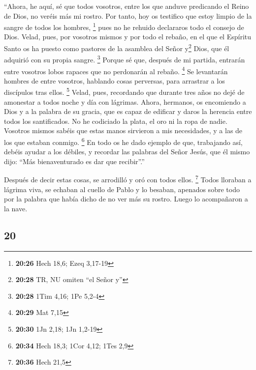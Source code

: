 \begin{paracol}{2}
 ``Ahora, he aquí, sé que todos vosotros, entre los que
anduve predicando el Reino de Dios, no veréis más mi rostro.
 Por tanto, hoy os testifico que estoy limpio de la
sangre de todos los hombres, \footnote{\textbf{20:26} Hech 18,6; Ezeq
  3,17-19}  pues no he rehuido declararos todo el consejo
de Dios.  Velad, pues, por vosotros mismos y por todo el
rebaño, en el que el Espíritu Santo os ha puesto como pastores de la
asamblea del Señor y\footnote{\textbf{20:28} TR, NU omiten ``el Señor
  y''} Dios, que él adquirió con su propia sangre. \footnote{\textbf{20:28}
  1Tim 4,16; 1Pe 5,2-4}  Porque sé que, después de mi
partida, entrarán entre vosotros lobos rapaces que no perdonarán al
rebaño. \footnote{\textbf{20:29} Mat 7,15}  Se levantarán
hombres de entre vosotros, hablando cosas perversas, para arrastrar a
los discípulos tras ellos. \footnote{\textbf{20:30} 1Jn 2,18; 1Jn 1,2-19}
 Velad, pues, recordando que durante tres años no dejé de
amonestar a todos noche y día con lágrimas.  Ahora,
hermanos, os encomiendo a Dios y a la palabra de su gracia, que es capaz
de edificar y daros la herencia entre todos los santificados.
 No he codiciado la plata, el oro ni la ropa de nadie.
 Vosotros mismos sabéis que estas manos sirvieron a mis
necesidades, y a las de los que estaban conmigo. \footnote{\textbf{20:34}
  Hech 18,3; 1Cor 4,12; 1Tes 2,9}  En todo os he dado
ejemplo de que, trabajando así, debéis ayudar a los débiles, y recordar
las palabras del Señor Jesús, que él mismo dijo: ``Más bienaventurado es
dar que recibir''.''

 Después de decir estas cosas, se arrodilló y oró con
todos ellos. \footnote{\textbf{20:36} Hech 21,5}  Todos
lloraban a lágrima viva, se echaban al cuello de Pablo y lo besaban,
 apenados sobre todo por la palabra que había dicho de no
ver más su rostro. Luego lo acompañaron a la nave.

\switchcolumn
\begin{otherlanguage}{english}

\hypertarget{section-39}{%
\section{20}\label{section-39}}


\end{otherlanguage}
\end{paracol}
